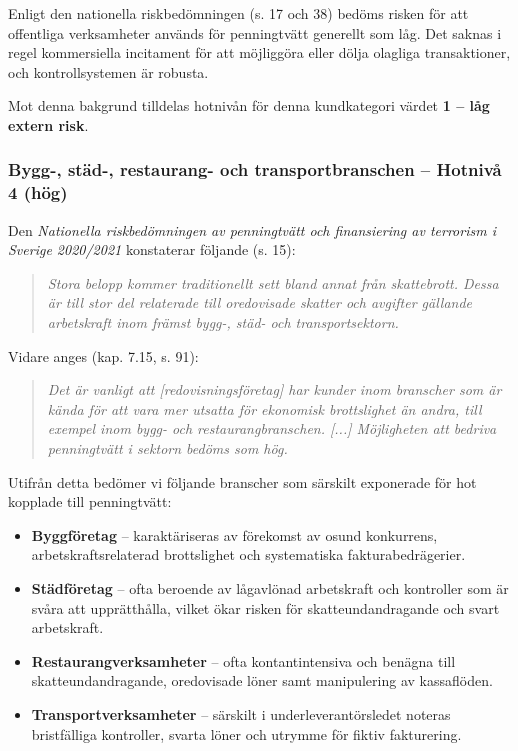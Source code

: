 \documentclass{article}
\begin{document}
Enligt den nationella riskbedömningen (s. 17 och 38) bedöms risken för att offentliga verksamheter används för penningtvätt generellt som låg. Det saknas i regel kommersiella incitament för att möjliggöra eller dölja olagliga transaktioner, och kontrollsystemen är robusta. 

Mot denna bakgrund tilldelas hotnivån för denna kundkategori värdet \textbf{1 – låg extern risk}.




\subsubsection*{Bygg-, städ-, restaurang- och transportbranschen – Hotnivå 4 (hög)}

Den \textit{Nationella riskbedömningen av penningtvätt och finansiering av terrorism i Sverige 2020/2021} konstaterar följande (s. 15):

\begin{quote}
\itshape
Stora belopp kommer traditionellt sett bland annat från skattebrott. Dessa är till stor del relaterade till oredovisade skatter och avgifter gällande arbetskraft inom främst bygg-, städ- och transportsektorn.
\end{quote}

Vidare anges (kap. 7.15, s. 91):

\begin{quote}
\itshape
Det är vanligt att [redovisningsföretag] har kunder inom branscher som är kända för att vara mer utsatta för ekonomisk brottslighet än andra, till exempel inom bygg- och restaurangbranschen. [...] Möjligheten att bedriva penningtvätt i sektorn bedöms som hög.
\end{quote}

Utifrån detta bedömer vi följande branscher som särskilt exponerade för hot kopplade till penningtvätt:

\begin{itemize}
\item \textbf{Byggföretag} – karaktäriseras av förekomst av osund konkurrens, arbetskraftsrelaterad brottslighet och systematiska fakturabedrägerier.
\item \textbf{Städföretag} – ofta beroende av lågavlönad arbetskraft och kontroller som är svåra att upprätthålla, vilket ökar risken för skatteundandragande och svart arbetskraft.
\item \textbf{Restaurangverksamheter} – ofta kontantintensiva och benägna till skatteundandragande, oredovisade löner samt manipulering av kassaflöden.
\item \textbf{Transportverksamheter} – särskilt i underleverantörsledet noteras bristfälliga kontroller, svarta löner och utrymme för fiktiv fakturering.
\end{itemize}
\end{document}
